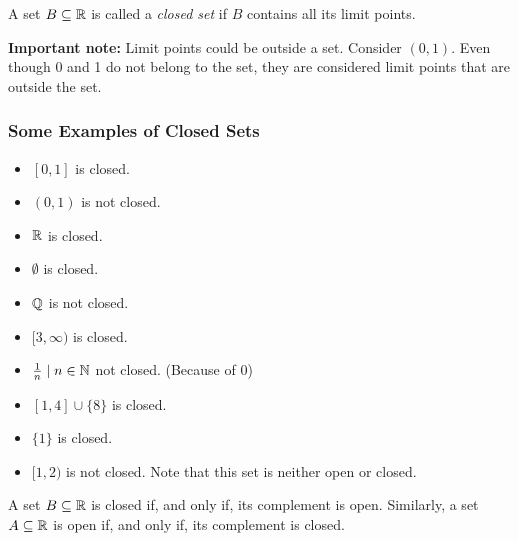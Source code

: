 \begin{definition}
    A set \(B \subseteq \mathbb{R}\) is called a \textit{closed set} if \(B\) contains all its limit points. 
\end{definition}

\begin{note}
    \textbf{Important note:} Limit points could be outside a set. Consider \((0,1)\). Even though 0 and 1 do not belong to the set, they are considered limit points that are outside the set.
\end{note}

\subsubsection{Some Examples of Closed Sets}
\begin{multicols}{2}
    \begin{itemize}
        \item \([0,1]\) is closed.
        \item \((0,1)\) is not closed.
        \item \(\mathbb{R}\) is closed.
        \item \(\emptyset\) is closed.
        \item \(\mathbb{Q}\) is not closed.
        \item \([3, \infty)\) is closed.
        \item \(\frac{1}{n} \mid n \in \mathbb{N}\) not closed. (Because of 0)
        \item \([1,4] \cup \{8\}\) is closed. 
        \item \(\{1\}\) is closed. 
        \item \([1,2)\) is not closed. Note that this set is neither open or closed. 
    \end{itemize}
\end{multicols}

\begin{theorem}
    A set \(B \subseteq \mathbb{R}\) is closed if, and only if, its complement is open. Similarly, a set \(A \subseteq \mathbb{R}\) is open if, and only if, its complement is closed.
\end{theorem}


